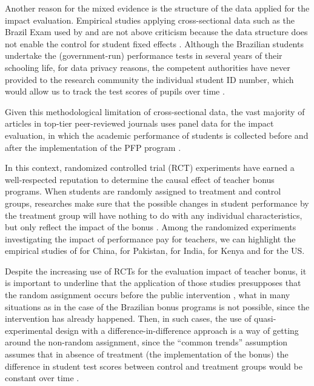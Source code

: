 \documentclass[a4paper, 12pt]{article}
\begin{document}
Another reason for the mixed evidence is the structure of the data applied for the impact evaluation. Empirical studies applying cross-sectional data \textemdash such as the Brazil Exam used by \citet{lepine2016teacher} and \citet{oshiro2015impacto} \textemdash are not above criticism because the data structure does not enable the control for student fixed effects \citep{loeb2000examining}. Although the Brazilian students undertake the (government-run) performance tests in several years of their schooling life, for data privacy reasons, the competent authorities have never provided to the research community the individual student ID number, which would allow us to track the test scores of pupils over time \citep{brooke2011geres}. 




Given this methodological limitation of cross-sectional data, the vast majority of articles in top-tier peer-reviewed journals uses panel data for the impact evaluation, in which the academic performance of students is collected before and after the implementation of the PFP program \citep[see e.g.][]{loyalka2019pay,barrera2017teacher, britton2016teacher, behrman2015aligning, dee2015incentives, imberman2015incentive, yuan2013incentive, lavy2009performance}.



In this context, randomized controlled trial (RCT) experiments have earned a well-respected reputation to determine the causal effect of teacher bonus programs. When students are randomly assigned to treatment and control groups, researches make sure that the possible changes in student performance by the treatment group will have nothing to do with any individual characteristics, but only reflect the impact of the bonus \citep{gertler2016impact}. Among the randomized experiments investigating the impact of performance pay for teachers, we can highlight the empirical studies of \citet{loyalka2019pay} for China, \citet{barrera2017teacher} for Pakistan, \citet{muralidharan2011teacher} for India, \citet{glewwe2010teacher} for Kenya and \citet{fryer2013teacher, goodman2013design, springer2012team} for the US.



Despite the increasing use of RCTs for the evaluation impact of teacher bonus, it is important to underline that the application of those studies presupposes that the random assignment occurs before the public intervention \citep{petrou2011economic}, what in many situations \textemdash as in the case of the Brazilian bonus programs \textemdash is not possible, since the intervention has already happened. Then, in such cases, the use of quasi-experimental design with a difference-in-difference approach is a way of getting around the non-random assignment, since the ``common trends'' assumption assumes that in absence of treatment (the implementation of the bonus) the difference in student test scores between control and treatment groups would be constant over time \citep{deschenes2018quasi}.
\end{document}
